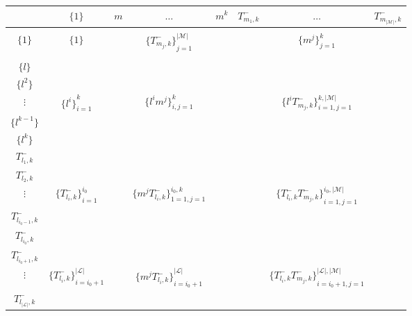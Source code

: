 \documentclass[12pt]{article}
\begin{document}
\begin{center}
\begin{tabular}{c|c::ccc:ccc} 
			                  &   $\big \lbrace1\big \rbrace$ & $m$  & $\dots$ & $m^k$ & $T_{m_1,k}^-$ &    $\dots$ &  $T_{m_{\vert \mathcal{M}\vert},k}^-$   \\ \hline
&&&&&&&\\
$\big \lbrace 1 \big \rbrace$  		&  $\big \lbrace1\big \rbrace$ && ${\big \lbrace T_{m_{j},k}^- \big \rbrace}_{j=1}^{\vert \mathcal{M}\vert}$ &&& $\big \lbrace m^j \big \rbrace_{j=1}^k$ &\\ 
&&&&\\ \hdashline
 \hdashline
$\big \lbrace l \big \rbrace$  &&&&&&&\\
$\big \lbrace l^2 \big \rbrace$  &&&&&&&\\
$\vdots$  				& ${\big \lbrace l^i \big \rbrace}_{i=1}^{k}$&& $\big \lbrace l^im^j \big \rbrace_{i,j=1}^k$ & && $\big \lbrace l^iT_{m_{j},k}^- \big \rbrace_{i=1,j=1}^{k,\vert \mathcal{M}\vert}$&\\
$\big \lbrace l^{k-1} \big \rbrace$  &&&&&&&\\
$\big \lbrace l^k \big \rbrace$  &&&&&&&\\
\hdashline
$T_{l_1,k}^-$  			&  				 &&&&&&\\
$T_{l_2,k}^-$  			&   				 &&&&&&\\
$\vdots$  				& ${\big \lbrace T_{l_{i},k}^- \big \rbrace}_{i=1}^{i_0}$ && $\big \lbrace m^jT_{l_{i},k}^- \big \rbrace_{1=1,j=1}^{i_0,k}$ && & ${\big \lbrace T_{l_{i},k}^-T_{m_{j},k}^- \big \rbrace}_{i=1,j=1}^{i_0,\vert \mathcal{M}\vert}$ &\\
$T_{l_{i_0-1},k}^-$  		&   &&&&&&\\
$T_{l_{i_0},k}^-$  		& &&&&&&\\ \hdashline
$T_{l_{i_0+1},k}^-$  		& &&&&&&\\
$\vdots$  				&  ${\big \lbrace T_{l_{i},k}^- \big \rbrace}_{i=i_0+1}^{\vert \mathcal{L} \vert}$ && ${\big \lbrace m^jT_{l_{i},k}^- \big \rbrace}_{i=i_0+1}^{\vert \mathcal{L} \vert}$&&&${\big \lbrace T_{l_{i},k}^-T_{m_{j},k}^- \big \rbrace}_{i=i_0+1,j=1}^{\vert \mathcal{L} \vert,\vert \mathcal{M} \vert}$ &\\
$T_{l_{\vert \mathcal{L} \vert},k}^-$  &&&&&&&\\ 
\end{tabular}
\end{center}
\vspace{1in}
\end{document}
